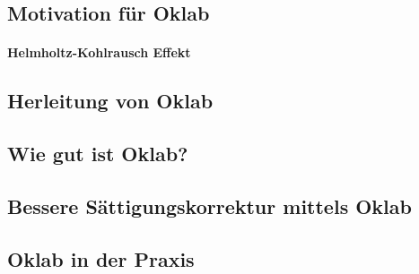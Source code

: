 \documentclass[12pt, a4paper, ngerman]{article}
\begin{document}
\subsection{Motivation für Oklab}
\paragraph{Helmholtz-Kohlrausch Effekt}
\subsection{Herleitung von Oklab}
\subsection{Wie gut ist Oklab?}
\subsection{Bessere Sättigungskorrektur mittels Oklab}
\subsection{Oklab in der Praxis}

\printbibliography
\end{document}
